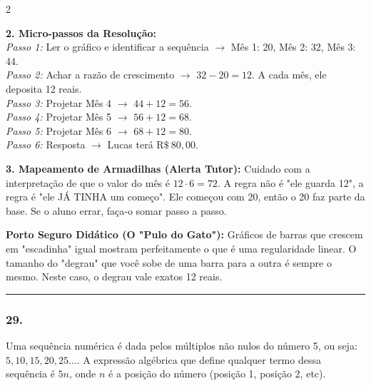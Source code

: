 \begin{multicols*}{2}
\begin{tcolorbox}[colback=CorTitUm!5, colframe=CorTitUm, boxrule=1pt, arc=4pt, left=6pt, right=6pt, top=6pt, bottom=6pt]
    \textbf{2. Micro-passos da Resolução:}\\
    \textit{Passo 1:} Ler o gráfico e identificar a sequência $\rightarrow$ Mês 1: 20, Mês 2: 32, Mês 3: 44.\\
    \textit{Passo 2:} Achar a razão de crescimento $\rightarrow$ $32 - 20 = 12$. A cada mês, ele deposita 12 reais.\\
    \textit{Passo 3:} Projetar Mês 4 $\rightarrow$ $44 + 12 = 56$.\\
    \textit{Passo 4:} Projetar Mês 5 $\rightarrow$ $56 + 12 = 68$.\\
    \textit{Passo 5:} Projetar Mês 6 $\rightarrow$ $68 + 12 = 80$.\\
    \textit{Passo 6:} Resposta $\rightarrow$ Lucas terá $ \text{R\$} \ 80,00 $.\par\vspace{0.1cm}
    
    \textbf{3. Mapeamento de Armadilhas (Alerta Tutor):} Cuidado com a interpretação de que o valor do mês é $12 \cdot 6 = 72$. A regra não é "ele guarda 12", a regra é "ele JÁ TINHA um começo". Ele começou com 20, então o 20 faz parte da base. Se o aluno errar, faça-o somar passo a passo.
    \end{tcolorbox}
    \vspace{0.15cm}
    
    \begin{boxexplicacao}
    \textbf{Porto Seguro Didático (O "Pulo do Gato"):} Gráficos de barras que crescem em "escadinha" igual mostram perfeitamente o que é uma regularidade linear. O tamanho do "degrau" que você sobe de uma barra para a outra é sempre o mesmo. Neste caso, o degrau vale exatos 12 reais.
    \end{boxexplicacao}
\fi

\par\vspace{\espacoQuestao}

\noindent\textcolor{CorLinha}{\rule{\linewidth}{0.5pt}} 
\par\vspace{\espacoPreQuestao}
\subsubsection*{29.} 
\begin{enunciadoLiteral}
Uma sequência numérica é dada pelos múltiplos não nulos do número 5, ou seja: $ 5, 10, 15, 20, 25 \dots $. A expressão algébrica que define qualquer termo dessa sequência é $5n$, onde $n$ é a posição do número (posição 1, posição 2, etc).


\end{enunciadoLiteral}
\end{multicols*}
